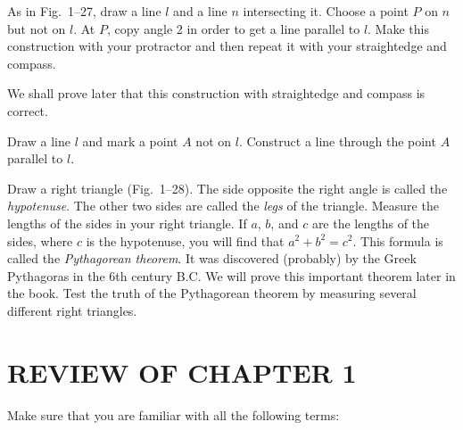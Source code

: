 \documentclass[11pt]{book}
\theoremstyle{bkplain}
\theoremstyle{XIplainnote}
\theoremstyle{bkplain}
\theoremstyle{bkplain}
\begin{document}
\begin{exercisecols}
\begin{exlist}
      As in Fig.~1--27, draw a line $l$ and a line $n$ intersecting it. Choose a
      point $P$ on $n$ but not on $l$. At $P$, copy angle 2 in order to get a line
      parallel to $l$. Make this construction with your protractor and then repeat
      it with your straightedge and compass.

      We shall prove later that this construction with straightedge and compass is
      correct.
\exfig{\FIGITWENTYSIX}
\exfig{\FIGITWENTYSEVEN}
\item Draw a line $l$ and mark a point $A$ not on $l$. Construct a line through
      the point $A$ parallel to $l$.
\item Draw a right triangle (Fig.~1--28). The side opposite the right angle is
      called the \emph{hypotenuse}. The other two sides are called the \emph{legs}
      of the triangle. Measure the lengths of the sides in your right triangle. If
      $a$, $b$, and $c$ are the lengths of the sides, where $c$ is the hypotenuse,
      you will find that $a^2 + b^2 = c^2$. This formula is called the
      \emph{Pythagorean theorem}. It was discovered (probably) by the Greek
      Pythagoras in the 6th century B.C. We will prove this important theorem
      later in the book. Test the truth of the Pythagorean theorem by measuring
      several different right triangles.
\exfig{\FIGITWENTYEIGHT}
\end{exlist}
\end{exercisecols}

\section*{REVIEW OF CHAPTER 1}

\begin{exlist}
\item Make sure that you are familiar with all the following terms:
\end{exlist}
\end{document}
